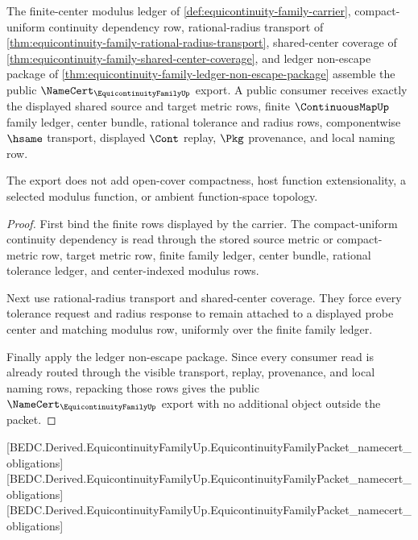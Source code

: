 \begin{theorem}
\label{thm:equicontinuity-family-public-namecert-export}
The finite-center modulus ledger of \autoref{def:equicontinuity-family-carrier}, compact-uniform continuity dependency row, rational-radius transport of \autoref{thm:equicontinuity-family-rational-radius-transport}, shared-center coverage of \autoref{thm:equicontinuity-family-shared-center-coverage}, and ledger non-escape package of \autoref{thm:equicontinuity-family-ledger-non-escape-package} assemble the public $\NameCert_{\EquicontinuityFamilyUp}$ export. A public consumer receives exactly the displayed shared source and target metric rows, finite $\ContinuousMapUp$ family ledger, center bundle, rational tolerance and radius rows, componentwise $\hsame$ transport, displayed $\Cont$ replay, $\Pkg$ provenance, and local naming row.

The export does not add open-cover compactness, host function extensionality, a selected modulus function, or ambient function-space topology.
\end{theorem}
\begin{proof}
First bind the finite rows displayed by the carrier. The compact-uniform continuity dependency is read through the stored source metric or compact-metric row, target metric row, finite family ledger, center bundle, rational tolerance ledger, and center-indexed modulus rows.

Next use rational-radius transport and shared-center coverage. They force every tolerance request and radius response to remain attached to a displayed probe center and matching modulus row, uniformly over the finite family ledger.

Finally apply the ledger non-escape package. Since every consumer read is already routed through the visible transport, replay, provenance, and local naming rows, repacking those rows gives the public $\NameCert_{\EquicontinuityFamilyUp}$ export with no additional object outside the packet.
\end{proof}

[BEDC.Derived.EquicontinuityFamilyUp.EquicontinuityFamilyPacket\_namecert\_obligations]
[BEDC.Derived.EquicontinuityFamilyUp.EquicontinuityFamilyPacket\_namecert\_obligations]
[BEDC.Derived.EquicontinuityFamilyUp.EquicontinuityFamilyPacket\_namecert\_obligations]

